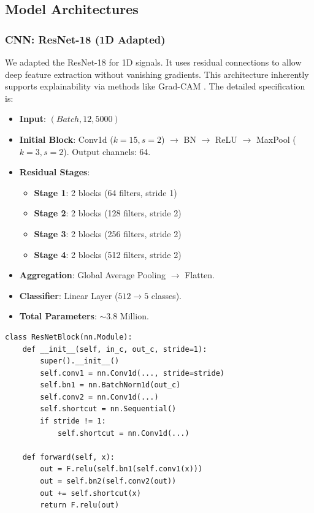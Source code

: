 \documentclass[conference]{IEEEtran}
\begin{document}
\subsection{Model Architectures}

\subsubsection{CNN: ResNet-18 (1D Adapted)}
We adapted the ResNet-18 \cite{he2016deep} for 1D signals. It uses residual connections to allow deep feature extraction without vanishing gradients. This architecture inherently supports explainability via methods like Grad-CAM \cite{selvaraju2017grad}. The detailed specification is:
\begin{itemize}
    \item \textbf{Input}: $(Batch, 12, 5000)$
    \item \textbf{Initial Block}: Conv1d ($k=15, s=2$) $\rightarrow$ BN $\rightarrow$ ReLU $\rightarrow$ MaxPool ($k=3, s=2$). Output channels: 64.
    \item \textbf{Residual Stages}:
    \begin{itemize}
        \item \textbf{Stage 1}: 2 blocks (64 filters, stride 1)
        \item \textbf{Stage 2}: 2 blocks (128 filters, stride 2)
        \item \textbf{Stage 3}: 2 blocks (256 filters, stride 2)
        \item \textbf{Stage 4}: 2 blocks (512 filters, stride 2)
    \end{itemize}
    \item \textbf{Aggregation}: Global Average Pooling $\rightarrow$ Flatten.
    \item \textbf{Classifier}: Linear Layer ($512 \rightarrow 5$ classes).
    \item \textbf{Total Parameters}: $\sim$3.8 Million.
\end{itemize}

\begin{lstlisting}[caption={ResNet Block Implementation},label={lst:resnet}]
class ResNetBlock(nn.Module):
    def __init__(self, in_c, out_c, stride=1):
        super().__init__()
        self.conv1 = nn.Conv1d(..., stride=stride)
        self.bn1 = nn.BatchNorm1d(out_c)
        self.conv2 = nn.Conv1d(...)
        self.shortcut = nn.Sequential()
        if stride != 1:
            self.shortcut = nn.Conv1d(...)

    def forward(self, x):
        out = F.relu(self.bn1(self.conv1(x)))
        out = self.bn2(self.conv2(out))
        out += self.shortcut(x)
        return F.relu(out)
\end{lstlisting}
\end{document}
